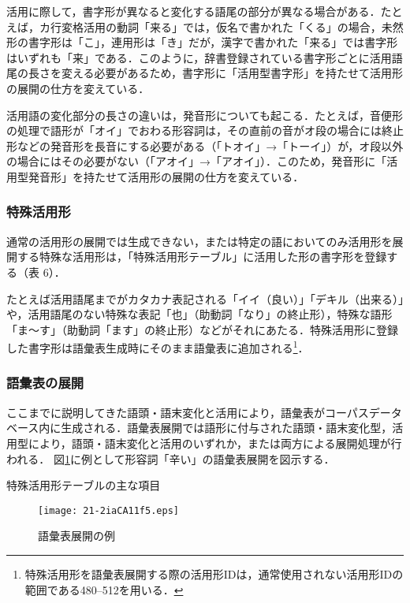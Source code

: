 \documentclass[japanese]{jnlp_1.4}
\begin{document}
活用に際して，書字形が異なると変化する語尾の部分が異なる場合がある．たとえば，カ行変格活用の動詞「来る」では，仮名で書かれた「くる」の場合，未然形の書字形は「こ」，連用形は「き」だが，漢字で書かれた「来る」では書字形はいずれも「来」である．このように，辞書登録されている書字形ごとに活用語尾の長さを変える必要があるため，書字形に「活用型書字形」を持たせて活用形の展開の仕方を変えている．

活用語の変化部分の長さの違いは，発音形についても起こる．たとえば，音便形の処理で語形が「オイ」でおわる形容詞は，その直前の音がオ段の場合には終止形などの発音形を長音にする必要がある（「トオイ」→「トーイ」）が，オ段以外の場合にはその必要がない（「アオイ」→「アオイ」）．このため，発音形に「活用型発音形」を持たせて活用形の展開の仕方を変えている．


\subsubsection*{特殊活用形}

通常の活用形の展開では生成できない，または特定の語においてのみ活用形を展開する特殊な活用形は，「特殊活用形テーブル」に活用した形の書字形を登録する（表 6）．

たとえば活用語尾までがカタカナ表記される「イイ（良い）」「デキル（出来る）」や，活用語尾のない特殊な表記「也」（助動詞「なり」の終止形），特殊な語形「ま〜す」（助動詞「ます」の終止形）などがそれにあたる．特殊活用形に登録した書字形は語彙表生成時にそのまま語彙表に追加される\footnote{特殊活用形を語彙表展開する際の活用形IDは，通常使用されない活用形IDの範囲である480--512を用いる．}．


\subsubsection*{語彙表の展開}

ここまでに説明してきた語頭・語末変化と活用により，語彙表がコーパスデータベース内に生成される．語彙表展開では語形に付与された語頭・語末変化型，活用型により，語頭・語末変化と活用のいずれか，または両方による展開処理が行われる．
図\ref{fig5}に例として形容詞「辛い」の語彙表展開を図示する．

\begin{table}[b]
\caption{特殊活用形テーブルの主な項目}
\label{tab6}

\end{table}

\begin{figure}[b]
\begin{center}
\texttt{[image: 21-2iaCA11f5.eps]}
\end{center}
\caption{語彙表展開の例}
\label{fig5}
\end{figure}
\end{document}
